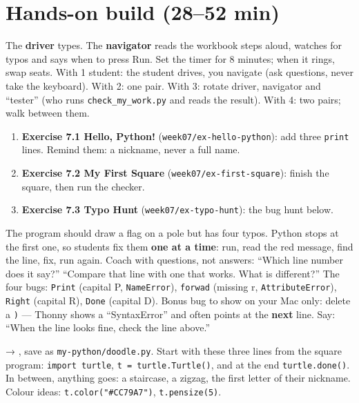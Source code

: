 \section{Hands-on build (28--52 min)}
\begin{pairroles}
The \textbf{driver} types. The \textbf{navigator} reads the workbook steps aloud, watches for typos and says when to press Run. Set the timer for 8 minutes; when it rings, swap seats.
With 1 student: the student drives, you navigate (ask questions, never take the keyboard). With 2: one pair. With 3: rotate driver, navigator and \enquote{tester} (who runs \texttt{check\_my\_work.py} and reads the result). With 4: two pairs; walk between them.
\end{pairroles}
\begin{enumerate}[leftmargin=1.4em,itemsep=2pt]
  \item \textbf{Exercise 7.1 Hello, Python!} (\texttt{week07/ex-hello-python}): add three \texttt{print} lines. Remind them: a nickname, never a full name.
  \item \textbf{Exercise 7.2 My First Square} (\texttt{week07/ex-first-square}): finish the square, then run the checker.
  \item \textbf{Exercise 7.3 Typo Hunt} (\texttt{week07/ex-typo-hunt}): the bug hunt below.
\end{enumerate}
\begin{bughunt}
The program should draw a flag on a pole but has four typos. Python stops at the first one, so students fix them \textbf{one at a time}: run, read the red message, find the line, fix, run again.
Coach with questions, not answers: \enquote{Which line number does it say?} \enquote{Compare that line with one that works. What is different?}
The four bugs: \texttt{Print} (capital P, \texttt{NameError}), \texttt{forwad} (missing r, \texttt{AttributeError}), \texttt{Right} (capital R), \texttt{Done} (capital D). Bonus bug to show on your Mac only: delete a \texttt{)} --- Thonny shows a \enquote{SyntaxError} and often points at the \textbf{next} line. Say: \enquote{When the line looks fine, check the line above.}
\end{bughunt}
\begin{freebuild}
 → , save as \texttt{my-python/doodle.py}. Start with these three lines from the square program: \texttt{import turtle}, \texttt{t = turtle.Turtle()}, and at the end \texttt{turtle.done()}. In between, anything goes: a staircase, a zigzag, the first letter of their nickname. Colour ideas: \texttt{t.color("\#CC79A7")}, \texttt{t.pensize(5)}.
\end{freebuild}

